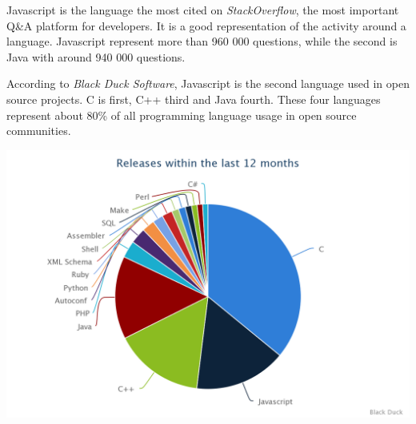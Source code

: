 Javascript is the language the most cited on \textit{StackOverflow}, the most important Q\&A platform for developers.
It is a good representation of the activity around a language.
Javascript represent more than 960 000 questions, while the second is Java with around 940 000 questions.


According to \textit{Black Duck Software}, Javascript is the second language used in open source projects.
C is first, C++ third and Java fourth.
These four languages represent about 80\% of all programming language usage in open source communities.

\includegraphics[width=0.9\linewidth]{../../data/js-trends/black-duck-15}



